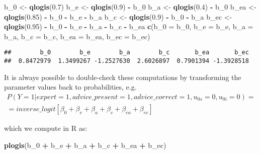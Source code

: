 \documentclass[
  man,floatsintext]{apa6}
\newenvironment{Shaded}{\begin{snugshade}}{\end{snugshade}}
\newcommand{\AttributeTok}[1]{\textcolor[rgb]{0.13,0.29,0.53}{#1}}
\newcommand{\FloatTok}[1]{\textcolor[rgb]{0.00,0.00,0.81}{#1}}
\newcommand{\FunctionTok}[1]{\textcolor[rgb]{0.13,0.29,0.53}{\textbf{#1}}}
\newcommand{\NormalTok}[1]{#1}
\newcommand{\OtherTok}[1]{\textcolor[rgb]{0.56,0.35,0.01}{#1}}
\newcommand{\SpecialCharTok}[1]{\textcolor[rgb]{0.81,0.36,0.00}{\textbf{#1}}}
\begin{document}
\begin{Shaded}
\begin{Highlighting}[]
\NormalTok{b\_0 }\OtherTok{\textless{}{-}} \FunctionTok{qlogis}\NormalTok{(}\FloatTok{0.7}\NormalTok{)}
\NormalTok{b\_e }\OtherTok{\textless{}{-}} \FunctionTok{qlogis}\NormalTok{(}\FloatTok{0.9}\NormalTok{) }\SpecialCharTok{{-}}\NormalTok{ b\_0}
\NormalTok{b\_a }\OtherTok{\textless{}{-}} \FunctionTok{qlogis}\NormalTok{(}\FloatTok{0.4}\NormalTok{) }\SpecialCharTok{{-}}\NormalTok{ b\_0}
\NormalTok{b\_ea }\OtherTok{\textless{}{-}} \FunctionTok{qlogis}\NormalTok{(}\FloatTok{0.85}\NormalTok{) }\SpecialCharTok{{-}}\NormalTok{ b\_0 }\SpecialCharTok{{-}}\NormalTok{ b\_e }\SpecialCharTok{{-}}\NormalTok{ b\_a}
\NormalTok{b\_c }\OtherTok{\textless{}{-}} \FunctionTok{qlogis}\NormalTok{(}\FloatTok{0.9}\NormalTok{) }\SpecialCharTok{{-}}\NormalTok{ b\_0 }\SpecialCharTok{{-}}\NormalTok{ b\_a}
\NormalTok{b\_ec }\OtherTok{\textless{}{-}} \FunctionTok{qlogis}\NormalTok{(}\FloatTok{0.95}\NormalTok{) }\SpecialCharTok{{-}}\NormalTok{ b\_0 }\SpecialCharTok{{-}}\NormalTok{ b\_e }\SpecialCharTok{{-}}\NormalTok{ b\_a }\SpecialCharTok{{-}}\NormalTok{ b\_c }\SpecialCharTok{{-}}\NormalTok{ b\_ea}
\FunctionTok{c}\NormalTok{(}\AttributeTok{b\_0 =}\NormalTok{ b\_0, }\AttributeTok{b\_e =}\NormalTok{ b\_e, }\AttributeTok{b\_a =}\NormalTok{ b\_a, }\AttributeTok{b\_c =}\NormalTok{ b\_c, }\AttributeTok{b\_ea =}\NormalTok{ b\_ea, }\AttributeTok{b\_ec =}\NormalTok{ b\_ec)}
\end{Highlighting}
\end{Shaded}

\begin{verbatim}
##        b_0        b_e        b_a        b_c       b_ea       b_ec 
##  0.8472979  1.3499267 -1.2527630  2.6026897  0.7901394 -1.3928518
\end{verbatim}

It is always possible to double-check these computations by transforming the parameter values back to probabilities, e.g.~
\[
\begin{aligned}
P(Y=1|expert = 1, advice\_present = 1, advice\_correct = 1, u_{0s} = 0, u_{0i} = 0) = \\
= inverse\_logit[\beta_0 + \beta_e + \beta_a + \beta_c + \beta_{ea} + \beta_{ec}]
\end{aligned}
\]

which we compute in R as:

\begin{Shaded}
\begin{Highlighting}[]
\FunctionTok{plogis}\NormalTok{(b\_0 }\SpecialCharTok{+}\NormalTok{ b\_e }\SpecialCharTok{+}\NormalTok{ b\_a }\SpecialCharTok{+}\NormalTok{ b\_c }\SpecialCharTok{+}\NormalTok{ b\_ea }\SpecialCharTok{+}\NormalTok{ b\_ec)}
\end{Highlighting}
\end{Shaded}
\end{document}

